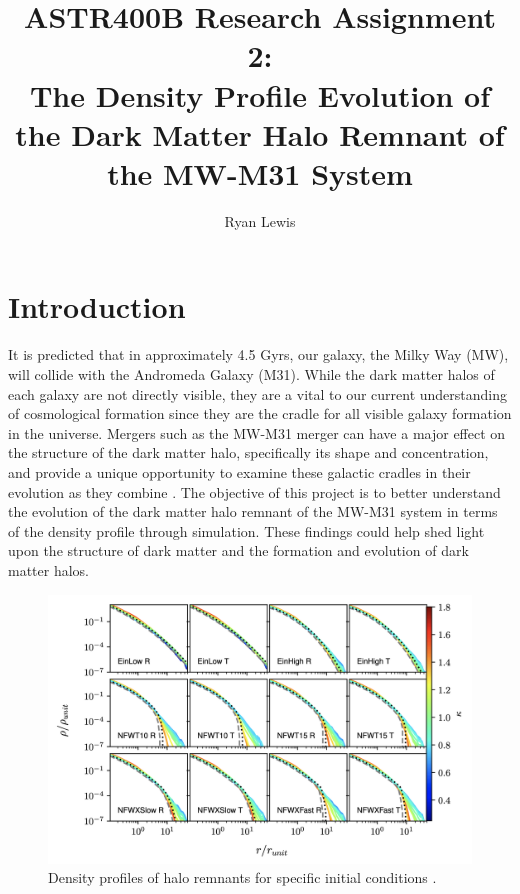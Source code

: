 \documentclass{aastex63}
\begin{document}
\title{ASTR400B Research Assignment 2: \\
The Density Profile Evolution of the Dark Matter Halo Remnant of the MW-M31 System}

\author{Ryan Lewis}

\section{Introduction} \label{sec:intro}

It is predicted that in approximately 4.5 Gyrs, our galaxy, the Milky Way (MW), will collide with the Andromeda Galaxy (M31). While the dark matter halos of each galaxy are not directly visible, they are a vital to our current understanding of cosmological formation since they are the cradle for all visible galaxy formation in the universe. Mergers such as the MW-M31 merger can have a major effect on the structure of the dark matter halo, specifically its shape and concentration, and provide a unique opportunity to examine these galactic cradles in their evolution as they combine \citep{Drakos2019I}.
The objective of this project is to better understand the evolution of the dark matter halo remnant of the MW-M31 system in terms of the density profile through simulation. These findings could help shed light upon the structure of dark matter and the formation and evolution of dark matter halos.


\begin{figure}[h!]
\centering
\includegraphics[scale=0.3]{Fig1.png}
\caption{Density profiles of halo remnants for specific initial conditions \citep{Drakos2019II}.}
\label{fig:universe}
\end{figure}
\end{document}

